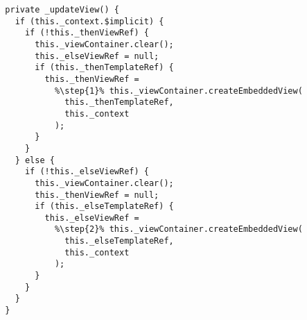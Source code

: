 \begin{verbatim}
  private _updateView() {
    if (this._context.$implicit) {
      if (!this._thenViewRef) {
        this._viewContainer.clear();
        this._elseViewRef = null;
        if (this._thenTemplateRef) {
          this._thenViewRef =
            %\step{1}% this._viewContainer.createEmbeddedView(
              this._thenTemplateRef,
              this._context
            );
        }
      }
    } else {
      if (!this._elseViewRef) {
        this._viewContainer.clear();
        this._thenViewRef = null;
        if (this._elseTemplateRef) {
          this._elseViewRef =
            %\step{2}% this._viewContainer.createEmbeddedView(
              this._elseTemplateRef,
              this._context
            );
        }
      }
    }
  }
\end{verbatim}
